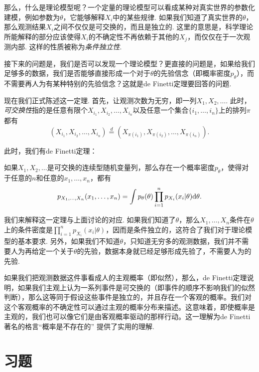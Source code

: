 那么，什么是理论模型呢？一个定量的理论模型可以看成某种对真实世界的参数化建模，例如参数为$\theta$，它能够解释$X_i$中的某些规律. 如果我们知道了真实世界的$\theta$，那么观测结果$X_i$之间不仅仅是可交换的，而且是独立的. 这里的意思是，科学理论所能解释的部分应该使得$X_i$的不确定性不再依赖于其他的$X_j$，而仅仅在于一次观测内部. 这样的性质被称为\textit{条件独立性}. 

接下来的问题是，我们是否可以发现一个理论模型？更直接的问题是，如果给我们足够多的数据，我们是否能够直接形成一个对于$\theta$的先验信念（即概率密度$p_\theta$），而不需要再人为有某种特别的先验信念？这就是de Finetti定理要回答的问题.

现在我们正式陈述这一定理. 首先，让观测次数为无穷，即一列$X_1,X_2,\dots$. 此时，\textit{可交换性}指的是任意有限个$X_{i_1},X_{i_2},\dots,X_{i_n}$以及任意一个集合$\{i_1,\dots,i_n\}$上的排列$\pi$都有
\[
    (X_{i_1},X_{i_2},\dots,X_{i_n})\stackrel{d}{=}(X_{\pi(i_1)},X_{\pi(i_2)},\dots,X_{\pi(i_n)}).
\]

此时，我们有de Finetti定理：

\begin{theorem}[de Finetti定理]
    如果$X_1,X_2,\dots$是可交换的连续型随机变量列，那么存在一个概率密度$p_\theta$，使得对于任意的$n$和任意的$x_1,\dots,x_n$，都有
    \[
        p_{X_1,\dots,X_n}(x_1,\dots,x_n) = \int p_\theta(\theta)\prod_{i=1}^n p_{X_i}(x_i|\theta)\mathrm{d}\theta.
    \]
\end{theorem}

我们来解释这一定理与上面讨论的对应. 如果我们知道了$\theta$，那么$X_1,\dots,X_n$条件在$\theta$上的条件密度是$\prod_{i=1}^n p_{X_i}(x_i|\theta)$，因而是条件独立的，这符合了我们对于理论模型的基本要求. 另外，如果我们不知道$\theta$，只知道无穷多的观测数据，我们并不需要人为再给定一个关于$\theta$的先验，数据本身就已经足够形成先验了，不需要人为的先验. 

\begin{remark}
    如果我们把观测数据这件事看成人的主观概率（即似然），那么，de Finetti定理说明，如果我们主观上认为一系列事件是可交换的（即事件的顺序不影响我们的似然判断），那么这等同于假设这些事件是独立的，并且存在一个客观的概率。我们对这个客观概率的不确定性可以通过主观的概率分布来描述。这意味着，即使概率是主观的，我们也可以像它们是由客观概率驱动的那样行动。这一理解为de Finetti著名的格言“概率是不存在的”\cite{spiegelhalterWhyProbabilityProbably2024} 提供了实用的理解.
\end{remark}

\section{习题}

